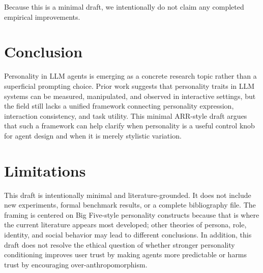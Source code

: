 \documentclass[11pt]{article}
\begin{document}
Because this is a minimal draft, we intentionally do not claim any completed empirical improvements.

\section{Conclusion}
Personality in LLM agents is emerging as a concrete research topic rather than a superficial prompting choice. Prior work suggests that personality traits in LLM systems can be measured, manipulated, and observed in interactive settings, but the field still lacks a unified framework connecting personality expression, interaction consistency, and task utility. This minimal ARR-style draft argues that such a framework can help clarify when personality is a useful control knob for agent design and when it is merely stylistic variation.

\section{Limitations}
This draft is intentionally minimal and literature-grounded. It does not include new experiments, formal benchmark results, or a complete bibliography file. The framing is centered on Big Five-style personality constructs because that is where the current literature appears most developed; other theories of persona, role, identity, and social behavior may lead to different conclusions. In addition, this draft does not resolve the ethical question of whether stronger personality conditioning improves user trust by making agents more predictable or harms trust by encouraging over-anthropomorphism.


\end{document}
